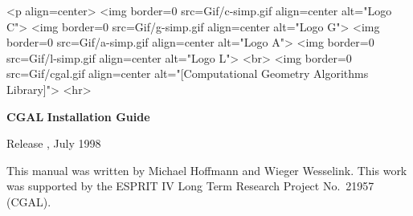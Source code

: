 
\pagestyle{empty}

\begin{titlepage}
  \mbox{} 
  \vspace{3cm}
  \ccTexHtml 
  {\centerline{
        }}
  {<p align=center>
    <img border=0 src=Gif/c-simp.gif align=center alt="Logo C">
    <img border=0 src=Gif/g-simp.gif align=center alt="Logo G">
    <img border=0 src=Gif/a-simp.gif align=center alt="Logo A">
    <img border=0 src=Gif/l-simp.gif align=center alt="Logo L">
    <br>
    <img border=0 src=Gif/cgal.gif align=center 
    alt="[Computational Geometry Algorithms Library]">
    <hr>}

  \vspace{2cm}
  \centerline{ {\Huge{\bf CGAL}} {\huge{\bf Installation Guide}} }
  
  \vspace{2cm}
  \newcommand{\mydate}{July 1998}
  \ccTexHtml
  {\renewcommand{\mydate}{\ifcase\the\month \or January\or
      February\or March\or April\or May\or June\or July\or August\or
      September\or October\or November\or December\fi \the\year}}{}
  \centerline{ {\large Release \cgalrelease, \mydate} }
\end{titlepage}

\mbox{}
\vfill
This manual was written by Michael Hoffmann and Wieger Wesselink.
\vfill
This work was supported
by the ESPRIT IV Long Term Research Project No.~21957 (CGAL).
\vspace{5cm}

\pagestyle{plain}
\setcounter{page}{0}
\cleardoublepage

